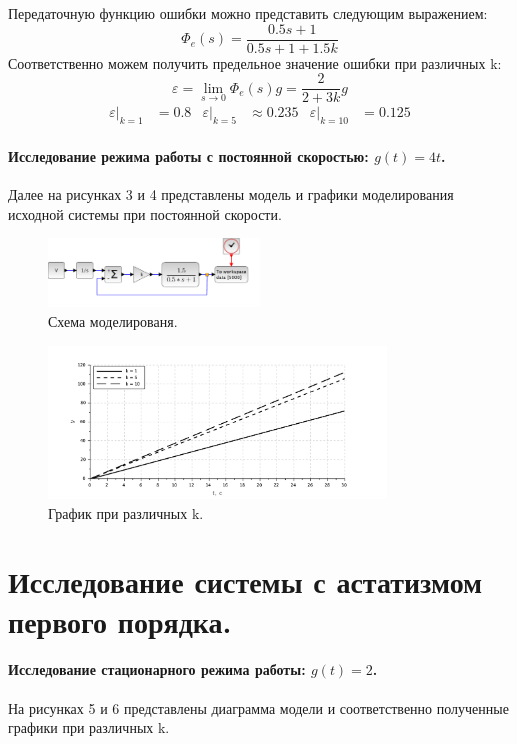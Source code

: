 \documentclass[a4paper, 11pt]{article}
\begin{document}
Передаточную функцию ошибки можно представить следующим выражением: 
\begin{equation}
    \Phi_e(s) = \frac{0.5s + 1}{0.5s + 1 + 1.5k}     
\end{equation}
Соответственно можем получить предельное значение ошибки при различных k:
\begin{equation}
    \varepsilon = \lim_{s\rightarrow 0}{\Phi_e(s)}g = \frac{2}{2 + 3k}g
\end{equation}
\begin{align*}
    \varepsilon|_{k = 1} & = 0.8 & \varepsilon|_{k = 5} & \approx 0.235 & \varepsilon|_{k = 10} & = 0.125
\end{align*}


\newpage
\paragraph{Исследование режима работы с постоянной скоростью: $g(t) = 4t$.}
Далее на рисунках 3 и 4 представлены модель и графики моделирования исходной системы при постоянной скорости.
\begin{figure}[h!]
    \centering
    \includegraphics[width = 0.5\textwidth]{images/model1-2.pdf}
    \caption{Схема моделированя.}
\end{figure}
\begin{figure}[h!]
    \centering
    \includegraphics[width = 0.8\textwidth]{images/graph1-2.pdf}
    \caption{График при различных k.}
\end{figure}

\section*{Исследование системы с астатизмом первого порядка.}
\paragraph{Исследование стационарного режима работы: $g(t) = 2$.} На рисунках 5 и 6 представлены диаграмма модели и соответственно полученные графики при различных k.
\end{document}
